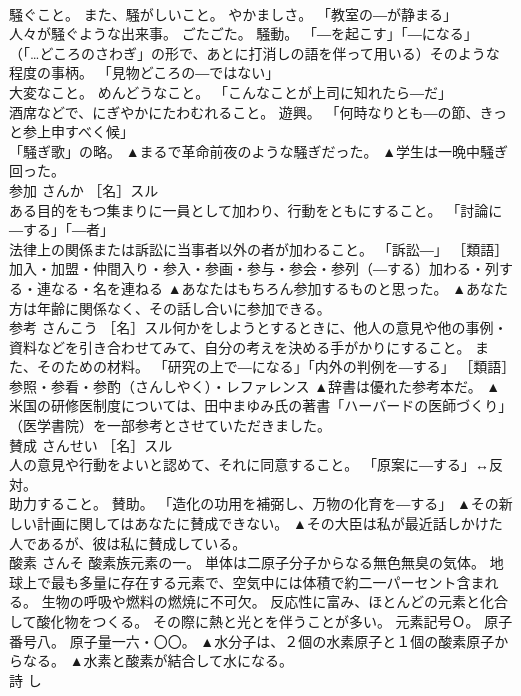 \documentclass[8pt]{extreport}
\begin{document}
\begin{CJK}{UTF8}{min}
\\	騒ぐこと。 また、騒がしいこと。 やかましさ。 「教室の―が静まる」 
\\	人々が騒ぐような出来事。 ごたごた。 騒動。 「―を起こす」「―になる」 
\\	（「…どころのさわぎ」の形で、あとに打消しの語を伴って用いる）そのような程度の事柄。 「見物どころの―ではない」 
\\	大変なこと。 めんどうなこと。 「こんなことが上司に知れたら―だ」 
\\	酒席などで、にぎやかにたわむれること。 遊興。 「何時なりとも―の節、きっと参上申すべく候」 
\\	「騒ぎ歌」の略。	▲まるで革命前夜のような騒ぎだった。 ▲学生は一晩中騒ぎ回った。
\\	参加	さんか	［名］スル 
\\	ある目的をもつ集まりに一員として加わり、行動をともにすること。 「討論に―する」「―者」 
\\	法律上の関係または訴訟に当事者以外の者が加わること。 「訴訟―」 ［類語］
\\	加入・加盟・仲間入り・参入・参画・参与・参会・参列（―する）加わる・列する・連なる・名を連ねる	▲あなたはもちろん参加するものと思った。 ▲あなた方は年齢に関係なく、その話し合いに参加できる。
\\	参考	さんこう	［名］スル何かをしようとするときに、他人の意見や他の事例・資料などを引き合わせてみて、自分の考えを決める手がかりにすること。 また、そのための材料。 「研究の上で―になる」「内外の判例を―する」 ［類語］参照・参看・参酌（さんしやく）・レファレンス	▲辞書は優れた参考本だ。 ▲米国の研修医制度については、田中まゆみ氏の著書「ハーバードの医師づくり」（医学書院）を一部参考とさせていただきました。
\\	賛成	さんせい	［名］スル 
\\	人の意見や行動をよいと認めて、それに同意すること。 「原案に―する」↔反対。 
\\	助力すること。 賛助。 「造化の功用を補弼し、万物の化育を―する」	▲その新しい計画に関してはあなたに賛成できない。 ▲その大臣は私が最近話しかけた人であるが、彼は私に賛成している。
\\	酸素	さんそ	酸素族元素の一。 単体は二原子分子からなる無色無臭の気体。 地球上で最も多量に存在する元素で、空気中には体積で約二一パーセント含まれる。 生物の呼吸や燃料の燃焼に不可欠。 反応性に富み、ほとんどの元素と化合して酸化物をつくる。 その際に熱と光とを伴うことが多い。 元素記号Ｏ。 原子番号八。 原子量一六・〇〇。	▲水分子は、２個の水素原子と１個の酸素原子からなる。 ▲水素と酸素が結合して水になる。
\\	詩	し	

\end{CJK}
\end{document}
